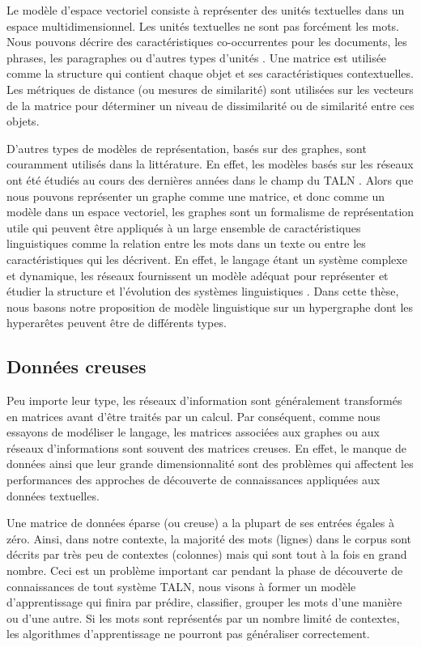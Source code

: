 \documentclass[a4paper,11pt,twoside]{article}
\begin{document}
Le modèle d'espace vectoriel consiste à représenter des unités textuelles dans un espace multidimensionnel. Les unités textuelles ne sont pas forcément les mots. Nous pouvons décrire des caractéristiques co-occurrentes pour les documents, les phrases, les paragraphes ou d'autres types d'unités \cite{manning1999foundations}. Une matrice est utilisée comme la structure qui contient chaque objet et ses caractéristiques contextuelles. Les métriques de distance (ou mesures de similarité) sont utilisées sur les vecteurs de la matrice pour déterminer un niveau de dissimilarité ou de similarité entre ces objets.

D'autres types de modèles de représentation, basés sur des graphes, sont couramment utilisés dans la littérature. En effet, les modèles basés sur les réseaux ont été étudiés au cours des dernières années dans le champ du TALN \cite{Mihalcea2011}. Alors que nous pouvons représenter un graphe comme une matrice, et donc comme un modèle dans un espace vectoriel, les graphes sont un formalisme de représentation utile qui peuvent être appliqués à un large ensemble de caractéristiques linguistiques comme la relation entre les mots dans un texte ou entre les caractéristiques qui les décrivent. En effet, le langage étant un système complexe et dynamique, les réseaux fournissent un modèle adéquat pour représenter et étudier la structure et l'évolution des systèmes linguistiques \cite{Choudhury2009}.
Dans cette thèse, nous basons notre proposition de modèle linguistique sur un hypergraphe dont les hyperarêtes peuvent être de différents types.

\subsection{Données creuses}

Peu importe leur type, les réseaux d'information sont généralement transformés en matrices avant d'être traités par un calcul. Par conséquent, comme nous essayons de modéliser le langage, les matrices associées aux graphes ou aux réseaux d'informations sont souvent des matrices creuses. En effet, le manque de données ainsi que leur grande dimensionnalité sont des problèmes qui affectent les performances des approches de découverte de connaissances \cite{mining12Book, PerinetH15} appliquées aux données textuelles.

Une matrice de données éparse (ou creuse) a la plupart de ses entrées égales à zéro. Ainsi, dans notre contexte, la majorité des mots (lignes) dans le corpus sont décrits par très peu de contextes (colonnes) mais qui sont tout à la fois en grand nombre. Ceci est un problème important car pendant la phase de découverte de connaissances de tout système TALN, nous visons à former un modèle d'apprentissage qui finira par prédire, classifier, grouper les mots d'une manière ou d'une autre. Si les mots sont représentés par un nombre limité de contextes, les algorithmes d'apprentissage ne pourront pas généraliser correctement.
\end{document}
